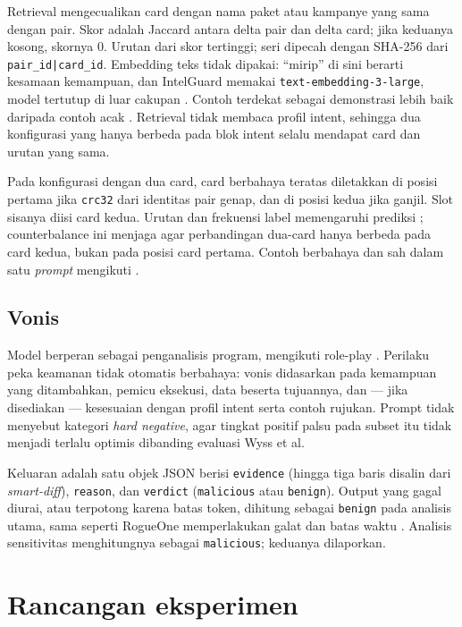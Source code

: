 \documentclass[a4paper,fleqn]{cas-dc}
\begin{document}
Retrieval mengecualikan card dengan nama paket atau kampanye yang sama dengan
pair. Skor adalah Jaccard antara delta pair dan delta card; jika keduanya
kosong, skornya 0. Urutan dari skor tertinggi; seri dipecah dengan SHA-256
dari \texttt{pair\_id|card\_id}. Embedding teks tidak dipakai: ``mirip'' di sini
berarti kesamaan kemampuan, dan IntelGuard memakai
\texttt{text-embedding-3-large}, model tertutup di luar cakupan
\citep{guo2026bridging}. Contoh terdekat sebagai demonstrasi lebih baik
daripada contoh acak \citep{liu2022makes}. Retrieval tidak membaca profil
intent, sehingga dua konfigurasi yang hanya berbeda pada blok intent selalu
mendapat card dan urutan yang sama.

Pada konfigurasi dengan dua card, card berbahaya teratas diletakkan di posisi
pertama jika \texttt{crc32} dari identitas pair genap, dan di posisi kedua jika
ganjil. Slot sisanya diisi card kedua. Urutan dan frekuensi label memengaruhi
prediksi \citep{zhao2021calibrate}; counterbalance ini menjaga agar
perbandingan dua-card hanya berbeda pada card kedua, bukan pada posisi card
pertama. Contoh berbahaya dan sah dalam satu \emph{prompt} mengikuti
\citet{gao2024customizing}.

\subsection{Vonis}

Model berperan sebagai penganalisis program, mengikuti role-play
\citet{wyss2025evaluating}. Perilaku peka keamanan tidak otomatis berbahaya:
vonis didasarkan pada kemampuan yang ditambahkan, pemicu eksekusi, data beserta
tujuannya, dan --- jika disediakan --- kesesuaian dengan profil intent serta
contoh rujukan. Prompt
tidak menyebut kategori \emph{hard negative}, agar tingkat positif palsu pada
subset itu tidak menjadi terlalu optimis dibanding evaluasi Wyss et al.

Keluaran adalah satu objek JSON berisi \texttt{evidence} (hingga tiga baris
disalin dari \emph{smart-diff}), \texttt{reason}, dan \texttt{verdict}
(\texttt{malicious} atau \texttt{benign}). Output yang gagal diurai, atau
terpotong karena batas token, dihitung sebagai \texttt{benign} pada analisis
utama, sama seperti RogueOne memperlakukan galat dan batas waktu
\citep{sofaer2024rogueone}. Analisis sensitivitas menghitungnya sebagai
\texttt{malicious}; keduanya dilaporkan.

\section{Rancangan eksperimen}\label{sec:setup}
\end{document}
